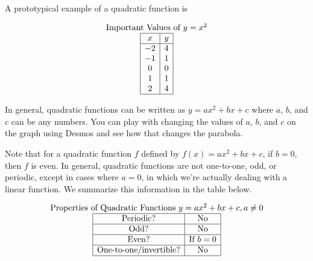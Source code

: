 \documentclass[nooutcomes]{ximera}
\begin{document}
\begin{example}
A prototypical example of a quadratic function is 

\begin{center}
\end{center}

\begin{center}
\end{center}

\[
\begin{array}{c  }
\text{\normalfont Important Values of $y=x^2$} \\
 \begin{array}{|c|c|}
 \hline
 x & y\\
 \hline
 -2&4\\
 -1&1\\
 0&0\\
 1&1\\
 2&4\\
 \hline
\end{array}
\end{array}
\]
\end{example}

In general, quadratic functions can be written as $y=ax^2+bx+c$ where $a$, $b$, and $c$ can be any numbers.  You can play with changing the values of $a$, $b$, and $c$ on the graph using Desmos and see how that changes the parabola.  

\begin{center}  
\end{center}

Note that for a quadratic function $f$ defined by $f(x) = ax^2 + bx + c$, if $b = 0$, then $f$ is even. In general, quadratic functions are not one-to-one, odd, or periodic, except in cases where $a = 0$, in which we're actually dealing with a linear function. We summarize this information in the table below.

\[
\begin{array}{  c  }
\text{\normalfont Properties of Quadratic Functions } y=ax^2 + bx + c, a \ne 0 \\
 \begin{array}{|c|c|}
 \hline
\text{Periodic?} & \text{No} \\ \hline
\text{Odd?} & \text{No} \\ \hline
\text{Even?} & \text{If } b = 0 \\ \hline
\text{One-to-one/invertible?} & \text{No}\\ \hline
\end{array}
\end{array}
\]
\end{document}
